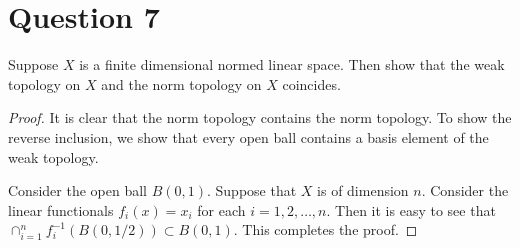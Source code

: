 \section{Question 7}
\horz

Suppose $X$ is a finite dimensional normed linear space. Then show that the weak topology on $X$ and the norm topology on $X$ coincides.

\horz
\begin{proof}
    It is clear that the norm topology contains the norm topology. To show the reverse inclusion, we show that every open ball contains a basis element of the weak topology.

    Consider the open ball $B\left( 0,1 \right)$. Suppose that $X$ is of dimension $n$. Consider the linear functionals $f_{i} (x) = x_{i}$ for each $i=1, 2, \ldots, n$. Then it is easy to see that $\cap_{i=1}^{n} f_{i}^{-1} \left( B\left( 0, 1/2 \right) \right) \subset B(0,1)$. This completes the proof.
\end{proof}

